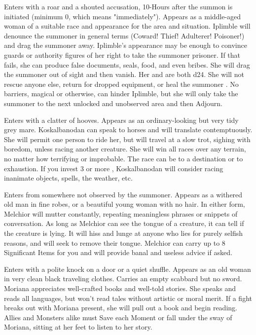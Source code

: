 {
Enters with a roar and a shouted accusation, 10-\SUMDICE Hours after the summon is initiated (minimum 0, which means "immediately"). Appears as a middle-aged woman of a suitable race and appearance for the area and situation. Iplimble will denounce the summoner in general terms (Coward! Thief! Adulterer! Poisoner!) and drag the summoner away. Iplimble's appearance may be enough to convince guards or authority figures of her right to take the summoner prisoner. If that fails, she can produce false documents, seals, food, and even bribes. She will drag the summoner out of sight and then vanish. Her \VIG and \MD are both d24. She will not rescue anyone else, return for dropped equipment, or heal the summoner . No barriers, magical or otherwise, can hinder Iplimble, but she will only take the summoner to the next unlocked and unobserved area and then Adjourn.


Enters with a clatter of hooves. Appears as an ordinary-looking but very tidy grey mare. Koskalbanodan can speak to horses and will translate contemptuously. She will permit one person to ride her, but will travel at a slow trot, sighing with boredom, unless racing another creature. She will win all races over any terrain, no matter how terrifying or improbable. The race can be to a destination or to exhaustion. If you invest 3 or more \DICE, Koskalbanodan will consider racing inanimate objects, spells, the weather, etc.


Enters from somewhere not observed by the summoner. Appears as a withered old man in fine robes, or a beautiful young woman with no hair. In either form, Melchior will mutter constantly, repeating meaningless phrases or snippets of conversation. As long as Melchior can see the tongue of a creature, it can tell if the creature is lying. It will hiss and lunge at anyone who lies for purely selfish reasons, and will seek to remove their tongue. Melchior can carry up to 8 Significant Items for you and will provide banal and useless advice if asked.


Enters with a polite knock on a door or a quiet shuffle. Appears as an old woman in very clean black traveling clothes. Carries an empty scabbard but no sword. Moriana appreciates well-crafted books and well-told stories. She speaks and reads all languages, but won't read tales without artistic or moral merit. If a fight breaks out with Moriana present, she will pull out a book and begin reading. Allies and Monsters alike must Save each Moment or fall under the sway of Moriana, sitting at her feet to listen to her story.




}
